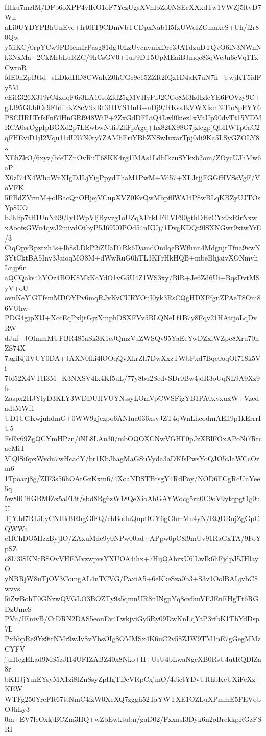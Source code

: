 fHku7mzlM/DFb6oXPP4ylKO1oF7YczUgsXVnIoZo0NSEeXXxdTw1VWZj5ltvD7Wh
aLi0UYDYPBhUnEvc+Irt0IT9CDmVbTCDpxNab1I5fxUWcIZGmaxeS+Uh/i2r80Qw
y5iiKC/0rpYCw9PDIcmIrPasg81dgJ0LzUycnvnixDrc3JATdzuDTQvO6iN3NWnN
k3NxMa+2CkMrbLuRZC/9hCsGV0+1uJ9DT5UpMEaiBJmqc83qWeJn6cVq1TxCwroR
fdE0hZpBttd+sLDkdHD8CWaKZ0hCGc9e15ZZR2fQz1D4aK7uN7h+UwjKT5idFy5M
eEiR326X3J9rC4xdqF6r3LA10soZfd25gMVHyPlJ2CGe8M3lsHzleYE6FOVzy9C+
gJJ95GIJdOr9FbhinkZ8cV9xRt31HVS1IuB+nDj9/RKssJkVWXfsm3iTlo8pFYY6
PSCIIRLTrfsFnf7lHnGRf948WiP+2ZxGdDFLtQ4Lwl0kiez1xVaUp90dvTt15YDM
RCA0srOgpIpBGXd2p7LEwbwNtfiJ2liFpAgq+hx82tX98G7jzlcgpjQbHWTp0aC2
qFHEviD1jI2Vqu11dU97N0ry7ZAMbEriYBbZNSwIuxarTpj0di9Ka5LSyGZOLY8x
XEhZkO/6xyz/bfeTZnOvRuT68KK4rg1lMAs1LdbIkzuSYkxb2om/ZOycUJhMw6aP
X0zI74X4WhoWnXIgDJLjYigPpydThaM1PwM+Vd57+XLJtjjFGGfHVSsVgF/VoVFK
5FBdZVrmM+olBacQnOHjejVCupXVZ0KvQwMbpfllWAI4P8wBLqKBZyUJTOsYp8UO
bJhlfp7tB1UnNi99/IyDWpVljByvzg1oUZqXFtkLFi1VF90gthDHzCYx9xRirNxw
xAoofsGWu4qwJ2mivdOtbyP5J69U0POd54nKUj/1DvgKDQt9lSXNGwr9xtwYrE/3
CiqOpyRpztxh4s+lh8sLDkP2iZUaD7Rk6DamdOnilqeBWfhnn4MdgnjrTfna9vwN
3YtCktBA5Inv3JaioqMO8M+dWwRuG0hTL3KFrHkHQB+mbeBhjaivXONmvhLnjp6n
aQCQaks4hYOz4BOK8MkKcYdO1vG5U4Z1WS3xy/BlR+Je6Zd6Ui+BqsDvtMSyV+oU
ovnKeYlGTfsmMDOYPv6mqRJvKvCURYOnI0yk3RsCQgHDXFfgnZPAeT8Oni86VUhw
PDG4gjpXlJ+XccEqPxljtGjzXmphDSXFVv5BLQNeLf1B7y8Fqv21HAtrjoLqDvRW
dJuf+JOlmmMUFBR485aSk3K1cJQmzVuZWSQv95YaEeYwDZxiWZpc8Xru70hZS74X
7agiI4jilVUY0DA+JAXN0fki4lOOqQvXkrZh7DwXxzTWbPxd7Bqc0oqOI718k5Vi
7bl52X4VTH3M+K3NXSV4lx4Kf5uL/77y8bu2SedvSDr0Bw4jdR3oUqNL9A9Xz9fs
Zaspx2HJYlyD3KLY3WDDUHVUYNssyLOmVpCWSFigYB1PA0xvxuxW+VzedadtMWf1
UD1UGKwjuhdmG+0WW9gjezpo6ANIua036xsvJZT4qWnLhcodmAEff9p1kErrrIU5
FsEv69ZgQCYmHPzn/iNL8LAu30/mbOQOXCNwVGHF0pJzXBlFOxAPoNi7RtcacMiT
VlQlSi6pxWvdn7wHcadY/br1KbJhagMaGSuVyda3aDKfsPwsYoQJO5iJaWCcOrm6
1Tpoazj8g/ZIF3s56hOAtGzKxm6/4XoaNDSTBtsgY4RdPoy/NOD6ECgRcUuYee5q
5w80CHGBMfZx5aFI3t/sbd8Rg6zW18QeXioAhGAYWocg5ru0C9oV9ytqpgt1g0uU
TjYJd7RLiLyCNHkBRhgGfFQ/chBoduQnptlGY6gGhrrMu4yN/RQDRujZgGpCQWWi
e1fChDO5HzzByjIO/ZAxuMde9y0NPw00ad+APpw0pC8l9mUv91RaGxTA/9FoYpSZ
c8l73lSKNcBSOvVHEMvzwpvsYXUOA4ihx+7HijQAbrxU6lLwIk6hFjdpJ5JHlayO
yNRRjW8uTjOV3ComgAL4nTCVG/PaxiA5+6eKkeSza0b3+S3v1OolBALjvbC8wvvs
5iZwBohT0GNzwQVGLO3BOZTy9s5qmnUR8nINgpYq8cv5mVFJEnEHgTt6RGDzUmcS
PVu/IEnivB/CtDRN2DAS5eouEv4FwkjviGy5Ry09DwKnLqYtP3rfbK1TbYdDsp7L
PxbbpRe9Yz9irNMr9wJv8vYbsOIg8OMMSx4K6uC2v58ZJW9TM1nE7gGegMMzCYFV
jjnHegELad9MS5zJI14UFIZABZ40x8Nko+H+UsU4bLwaNgeXB0RsU4utRQDlZa8r
bKHJjYmEYsyMX1zi8lZnSsyZpHgTDcVRpCxjmO/4JictYDvURhbKeUXiFeXz+KEW
WTFg250YreFR67ttNmC4fzW0XeXQ7zggh52TaYWTXE1OZLuXPmmE5FEVqbOJhLy3
0m+EV7leOxkjBCZm3HQ+wZbEwktubn/gaD02/FxxnsI3Dyk6n2oBrekkpRGzFSRI
